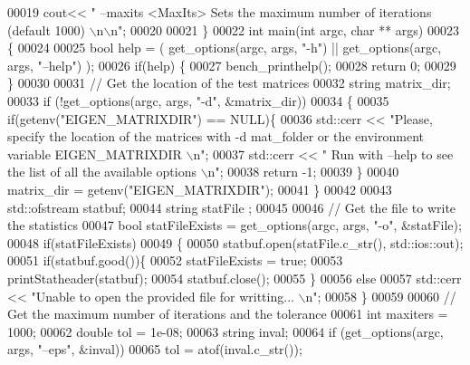 \begin{DoxyCode}
00019     cout<< \textcolor{stringliteral}{" --maxits <MaxIts> Sets the maximum number of iterations (default 1000) \(\backslash\)n\(\backslash\)n"};
00020     
00021 \}
00022 \textcolor{keywordtype}{int} main(\textcolor{keywordtype}{int} argc, \textcolor{keywordtype}{char} ** args)
00023 \{
00024   
00025   \textcolor{keywordtype}{bool} help = ( get\_options(argc, args, \textcolor{stringliteral}{"-h"}) || get\_options(argc, args, \textcolor{stringliteral}{"--help"}) );
00026   \textcolor{keywordflow}{if}(help) \{
00027     bench\_printhelp();
00028     \textcolor{keywordflow}{return} 0;
00029   \}
00030 
00031   \textcolor{comment}{// Get the location of the test matrices}
00032   \textcolor{keywordtype}{string} matrix\_dir;
00033   \textcolor{keywordflow}{if} (!get\_options(argc, args, \textcolor{stringliteral}{"-d"}, &matrix\_dir))
00034   \{
00035     \textcolor{keywordflow}{if}(getenv(\textcolor{stringliteral}{"EIGEN\_MATRIXDIR"}) == NULL)\{
00036       std::cerr << \textcolor{stringliteral}{"Please, specify the location of the matrices with -d mat\_folder or the environment
       variable EIGEN\_MATRIXDIR \(\backslash\)n"};
00037       std::cerr << \textcolor{stringliteral}{" Run with --help to see the list of all the available options \(\backslash\)n"};
00038       \textcolor{keywordflow}{return} -1;
00039     \}
00040     matrix\_dir = getenv(\textcolor{stringliteral}{"EIGEN\_MATRIXDIR"});
00041   \}
00042      
00043   std::ofstream statbuf;
00044   \textcolor{keywordtype}{string} statFile ;
00045   
00046   \textcolor{comment}{// Get the file to write the statistics}
00047   \textcolor{keywordtype}{bool} statFileExists = get\_options(argc, args, \textcolor{stringliteral}{"-o"}, &statFile);
00048   \textcolor{keywordflow}{if}(statFileExists)
00049   \{
00050     statbuf.open(statFile.c\_str(), std::ios::out);
00051     \textcolor{keywordflow}{if}(statbuf.good())\{
00052       statFileExists = \textcolor{keyword}{true}; 
00053       printStatheader(statbuf);
00054       statbuf.close();
00055     \}
00056     \textcolor{keywordflow}{else}
00057       std::cerr << \textcolor{stringliteral}{"Unable to open the provided file for writting... \(\backslash\)n"};
00058   \}       
00059   
00060   \textcolor{comment}{// Get the maximum number of iterations and the tolerance}
00061   \textcolor{keywordtype}{int} maxiters = 1000; 
00062   \textcolor{keywordtype}{double} tol = 1e-08; 
00063   \textcolor{keywordtype}{string} inval; 
00064   \textcolor{keywordflow}{if} (get\_options(argc, args, \textcolor{stringliteral}{"--eps"}, &inval))
00065     tol = atof(inval.c\_str()); 

\end{DoxyCode}
